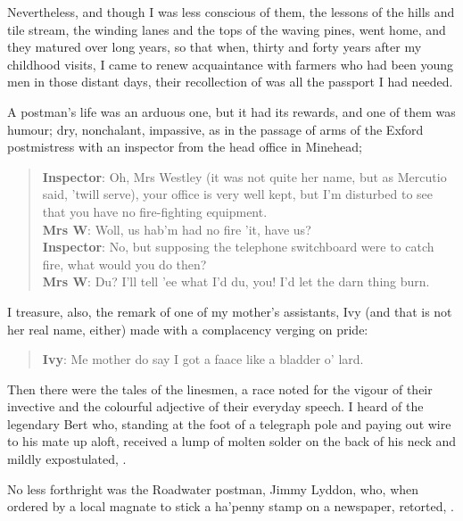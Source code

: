 Nevertheless, and though I was less conscious of them, the lessons of the hills and tile stream, the winding lanes and the tops of the waving pines, went home, and they matured over long years, so that when, thirty and forty years after my childhood visits, I came to renew acquaintance with farmers who had been young men in those distant days, their recollection of  was all the passport I had needed.

A postman's life was an arduous one, but it had its rewards, and one of them was humour; dry, nonchalant, impassive, as in the passage of arms of the Exford postmistress with an inspector from the head office in Minehead;

\begin{quotation}
\textbf{Inspector}: Oh, Mrs Westley (it was not quite her name, but as Mercutio said, 'twill serve), your office is very well kept, but I'm disturbed to see that you have no fire-fighting equipment. \\
\textbf{Mrs W}: Woll, us hab'm had no fire 'it, have us? \\
\textbf{Inspector}: No, but supposing the telephone switchboard were to catch fire, what would you do then? \\
\textbf{Mrs W}: Du? I'll tell 'ee what I'd du, you! I'd let the darn thing burn. \\
\end{quotation}

I treasure, also, the remark of one of my mother's assistants, Ivy (and that is not her real name, either) made with a complacency verging on pride:

\begin{quotation}
\textbf{Ivy}: Me mother do say I got a faace like a bladder o' lard.
\end{quotation}

Then there were the tales of the linesmen, a race noted for the vigour of their invective and the colourful adjective of their everyday speech. I heard of the legendary Bert who, standing at the foot of a telegraph pole and paying out wire to his mate up aloft, received a lump of molten solder on the back of his neck and mildly expostulated, .

No less forthright was the Roadwater postman, Jimmy Lyddon, who, when ordered by a local magnate to stick a ha'penny stamp on a newspaper, retorted, .

